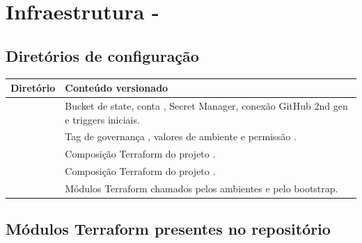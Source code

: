 \documentclass[11pt,a4paper]{article}
\begin{document}
\section{Infraestrutura - }

\subsection{Diretórios de configuração}

\begin{tabularx}{\textwidth}{L{34mm}Y}
\toprule
\textbf{Diretório} & \textbf{Conteúdo versionado} \\
\midrule
{} & Bucket de state, conta , Secret Manager, conexão GitHub 2nd gen e triggers iniciais. \\
 & Tag de governança , valores de ambiente e permissão . \\
 & Composição Terraform do projeto . \\
 & Composição Terraform do projeto . \\
 & Módulos Terraform chamados pelos ambientes e pelo bootstrap. \\
\bottomrule
\end{tabularx}

\clearpage
\subsection{Módulos Terraform presentes no repositório}
\end{document}
